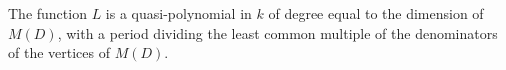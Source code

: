 \begin{proposition}\label{Bellamy19-prop-3.1}
The function $L$ is a quasi-polynomial in $k$ of degree equal to the dimension of $M(D)$, with a period dividing the least common multiple of the denominators of the vertices of $M(D)$.
\end{proposition}